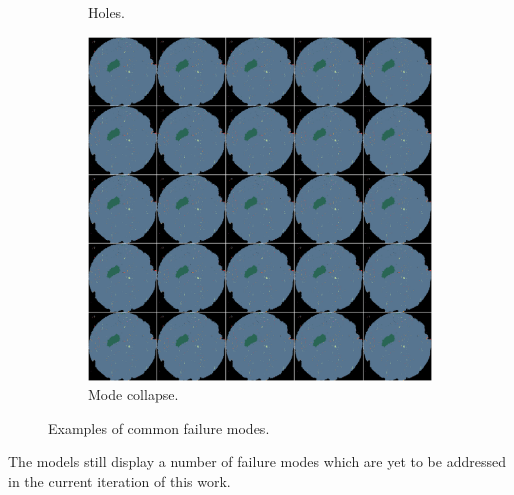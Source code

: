 \begin{figure}[h]
\begin{subfigure}[t]{0.19\textwidth}
        \caption{Holes.}
        \label{fig:holes}
    \end{subfigure} %
    \hfill
    \begin{subfigure}[t]{0.19\textwidth}
        \centering
        \includegraphics[width=\linewidth]{labels/figs/mode-collapse.png}
        \caption{Mode collapse.}
        \label{fig:mode_collapse}
    \end{subfigure} %
    \caption{Examples of common failure modes.}
    \label{fig:acgan_bad_sample}
\end{figure}

The models still display a number of failure modes which are yet to be addressed in the current iteration of this work.

